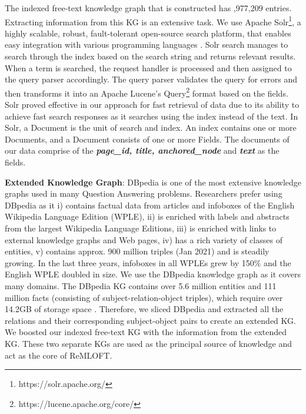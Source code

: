 \begin{sloppypar}
The indexed free-text knowledge graph that is constructed has {,977,209} entries. Extracting information from this KG is an extensive task. We use Apache Solr\footnote{\label{solr}https://solr.apache.org/}, a highly scalable, robust, fault-tolerant open-source search platform, that enables easy integration with various programming languages \cite{solr}. Solr search \cite{lucene} manages to search through the index
based on the search string and returns relevant results. When a term is searched, the request handler is processed and then assigned to the query parser accordingly. The query parser validates the query for errors and then transforms it into an Apache Lucene’s Query\footnote{https://lucene.apache.org/core/} format based on the fields. Solr proved effective in our approach for fast retrieval of data due to its ability to achieve fast search responses as it searches using the index instead of the text. In Solr, a Document is the unit of search and index. An index contains one or more Documents, and a Document consists of one or more Fields. The documents of our data comprise of the \textbf{\textit{page\_id, title, anchored\_node}} and \textit{\textbf{text}} as the fields.

\textbf{Extended Knowledge Graph}: DBpedia is one of the most extensive knowledge graphs used in many Question Answering problems. Researchers prefer using DBpedia as it 
i) contains factual data from articles and infoboxes of the English Wikipedia Language Edition (WPLE), ii) is enriched with labels and abstracts from the largest Wikipedia Language Editions, iii) is enriched with links to external knowledge graphs and Web pages, iv) has a rich variety of classes of entities, v) contains approx. 900 million triples (Jan 2021) and is steadily growing. In the last three years, infoboxes in all WPLEs grew by 150\% and the English WPLE doubled in size. We use the DBpedia knowledge graph as it covers many domains\cite{dbpedia}. The DBpedia KG contains over 5.6 million entities and 111 million facts (consisting of subject-relation-object triples), which require over 14.2GB of storage space \cite{dbpedia}. Therefore, we sliced DBpedia and extracted all the relations and their corresponding subject-object pairs to create an extended KG. We boosted our indexed free-text KG with the information from the extended KG. These two separate KGs are used as the principal source of knowledge and act as the core of ReMLOFT.


\end{sloppypar}
